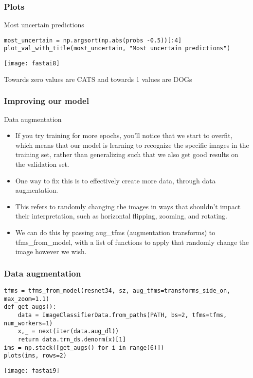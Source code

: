 \begin{frame}[fragile] \frametitle{Plots}
Most uncertain predictions
\begin{lstlisting}
most_uncertain = np.argsort(np.abs(probs -0.5))[:4]
plot_val_with_title(most_uncertain, "Most uncertain predictions")
\end{lstlisting}
\begin{center}
\texttt{[image: fastai8]}
\end{center}
Towards zero values are CATS and towards 1 values are DOGs
\end{frame}

\begin{frame}[fragile] \frametitle{Improving our model}
Data augmentation
\begin{itemize}
\item If you try training for more epochs, you'll notice that we start to overfit, which means that our model is learning to recognize the specific images in the training set, rather than generalizing such that we also get good results on the validation set. 
\item One way to fix this is to effectively create more data, through data augmentation. 
\item This refers to randomly changing the images in ways that shouldn't impact their interpretation, such as horizontal flipping, zooming, and rotating.
\item We can do this by passing aug\_tfms (augmentation transforms) to tfms\_from\_model, with a list of functions to apply that randomly change the image however we wish.
\end{itemize}

\end{frame}

\begin{frame}[fragile] \frametitle{Data augmentation}
\begin{lstlisting}
tfms = tfms_from_model(resnet34, sz, aug_tfms=transforms_side_on, max_zoom=1.1)
def get_augs():
    data = ImageClassifierData.from_paths(PATH, bs=2, tfms=tfms, num_workers=1)
    x,_ = next(iter(data.aug_dl))
    return data.trn_ds.denorm(x)[1]
ims = np.stack([get_augs() for i in range(6)])    
plots(ims, rows=2)
\end{lstlisting}
\begin{center}
\texttt{[image: fastai9]}
\end{center}
\end{frame}

